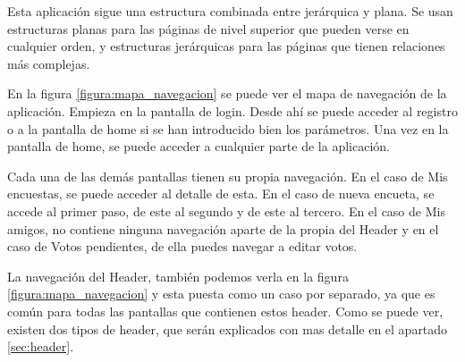 \documentclass[a4paper, 12pt]{book}
\begin{document}
Esta aplicaci\'on sigue una estructura combinada entre jer\'arquica y plana. Se usan estructuras
planas para las p\'aginas de nivel superior que pueden verse en cualquier orden, y estructuras
jer\'arquicas para las p\'aginas que tienen relaciones m\'as complejas.

En la figura \ref{figura:mapa_navegacion} se puede ver el mapa de navegaci\'on de la aplicaci\'on. Empieza en la pantalla de login. Desde ah\'i se puede acceder al registro o a la pantalla de home si se han introducido bien los par\'ametros. Una vez en la pantalla de home, se puede acceder a cualquier parte de la aplicaci\'on.

Cada una de las dem\'as pantallas tienen su propia navegaci\'on. En el caso de Mis encuestas, se puede acceder al detalle de esta. En el caso de nueva encueta, se accede al primer paso, de este al segundo y de este al tercero. En el caso de Mis amigos, no contiene ninguna navegaci\'on aparte de la propia del Header y en el caso de Votos pendientes, de ella puedes navegar a editar votos.

La navegaci\'on del Header, tambi\'en podemos verla en la figura \ref{figura:mapa_navegacion} y esta puesta como un caso por separado, ya que es com\'un para todas las pantallas que contienen estos header. Como se puede ver, existen dos tipos de header, que ser\'an explicados con mas detalle en el apartado \ref{sec:header}.
\end{document}

